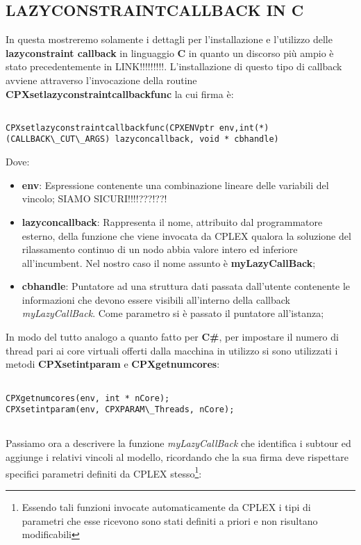 \documentclass[11pt]{article}
\begin{document}
\subsection*{LAZYCONSTRAINTCALLBACK IN C}
\label{sec:LazyDueS}

In questa mostreremo solamente i dettagli per l'installazione e l'utilizzo delle \textbf{lazyconstraint callback} in linguaggio \textbf{C} in quanto un discorso più ampio è stato precedentemente in LINK!!!!!!!!!.
L'installazione di questo tipo di callback avviene attraverso l'invocazione della routine \textbf{CPXsetlazyconstraintcallbackfunc} la cui firma è:

\begin{lstlisting}

CPXsetlazyconstraintcallbackfunc(CPXENVptr env,int(*)(CALLBACK\_CUT\_ARGS) lazyconcallback, void * cbhandle)

\end{lstlisting}

Dove:

\begin{itemize}
    \item \textbf{env}: Espressione contenente una combinazione lineare delle variabili del vincolo; SIAMO SICURI!!!!???!??!
    \item \textbf{lazyconcallback}: Rappresenta il nome, attribuito dal programmatore esterno, della funzione che viene invocata da CPLEX qualora la soluzione del rilassamento continuo di un nodo abbia valore intero ed inferiore all'incumbent. Nel nostro caso il nome assunto è \textbf{myLazyCallBack};
    \item \textbf{cbhandle}: Puntatore ad una struttura dati passata dall'utente contenente le informazioni che devono essere visibili all'interno della callback \textit{myLazyCallBack}. Come parametro si è passato il puntatore all'istanza;
\end{itemize}

In modo del tutto analogo a quanto fatto per \textbf{C\#}, per impostare il numero di thread pari ai core virtuali offerti dalla macchina in utilizzo si sono utilizzati i metodi \textbf{CPXsetintparam} e \textbf{CPXgetnumcores}:

\begin{lstlisting}

CPXgetnumcores(env, int * nCore);
CPXsetintparam(env, CPXPARAM\_Threads, nCore);


\end{lstlisting}

Passiamo ora a descrivere la funzione \textit{myLazyCallBack} che identifica i subtour ed aggiunge i relativi vincoli al modello, ricordando che la sua firma deve rispettare specifici parametri definiti da CPLEX stesso\footnote{Essendo tali funzioni invocate automaticamente da CPLEX i tipi di parametri che esse ricevono sono stati definiti a priori e non risultano modificabili}:
\end{document}
